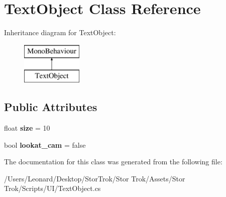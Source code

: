 \hypertarget{class_text_object}{}\section{Text\+Object Class Reference}
\label{class_text_object}
Inheritance diagram for Text\+Object\+:\begin{figure}[H]
\begin{center}
\leavevmode
\includegraphics[height=2.000000cm]{class_text_object}
\end{center}
\end{figure}
\subsection*{Public Attributes}
\begin{DoxyCompactItemize}
\item 
\mbox{\label{class_text_object_a21b8d88e1b60b579b2c82cb9d4baa1aa}} 
float {\bfseries size} = 10
\item 
\mbox{\label{class_text_object_a875c3ca5cca02704e0d4c453e16bcda1}} 
bool {\bfseries lookat\+\_\+cam} = false
\end{DoxyCompactItemize}


The documentation for this class was generated from the following file\+:\begin{DoxyCompactItemize}
\item 
/\+Users/\+Leonard/\+Desktop/\+Stor\+Trok/\+Stor Trok/\+Assets/\+Stor Trok/\+Scripts/\+U\+I/Text\+Object.\+cs\end{DoxyCompactItemize}
